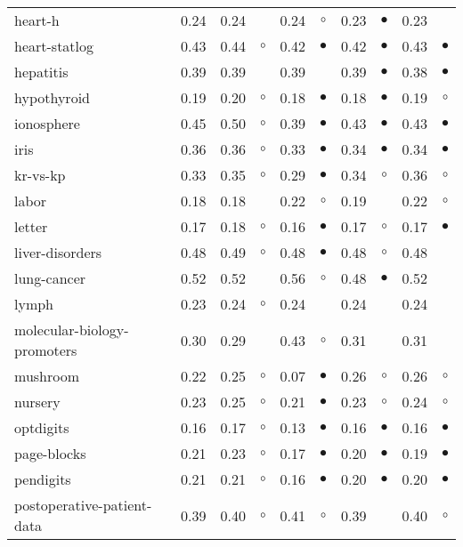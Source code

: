 {\begin{longtable}{lrr@{\hspace{0.1cm}}cr@{\hspace{0.1cm}}cr@{\hspace{0.1cm}}cr@{\hspace{0.1cm}}c}
heart-h & 0.24 & 0.24 &           & 0.24 &   $\circ$ & 0.23 & $\bullet$ & 0.23 &           \\
heart-statlog & 0.43 & 0.44 &   $\circ$ & 0.42 & $\bullet$ & 0.42 & $\bullet$ & 0.43 &  $\bullet$\\
hepatitis & 0.39 & 0.39 &           & 0.39 &           & 0.39 & $\bullet$ & 0.38 &  $\bullet$\\
hypothyroid & 0.19 & 0.20 &   $\circ$ & 0.18 & $\bullet$ & 0.18 & $\bullet$ & 0.19 &    $\circ$\\
ionosphere & 0.45 & 0.50 &   $\circ$ & 0.39 & $\bullet$ & 0.43 & $\bullet$ & 0.43 &  $\bullet$\\
iris & 0.36 & 0.36 &   $\circ$ & 0.33 & $\bullet$ & 0.34 & $\bullet$ & 0.34 &  $\bullet$\\
kr-vs-kp & 0.33 & 0.35 &   $\circ$ & 0.29 & $\bullet$ & 0.34 &   $\circ$ & 0.36 &    $\circ$\\
labor & 0.18 & 0.18 &           & 0.22 &   $\circ$ & 0.19 &           & 0.22 &    $\circ$\\
letter & 0.17 & 0.18 &   $\circ$ & 0.16 & $\bullet$ & 0.17 &   $\circ$ & 0.17 &  $\bullet$\\
liver-disorders & 0.48 & 0.49 &   $\circ$ & 0.48 & $\bullet$ & 0.48 &   $\circ$ & 0.48 &           \\
lung-cancer & 0.52 & 0.52 &           & 0.56 &   $\circ$ & 0.48 & $\bullet$ & 0.52 &           \\
lymph & 0.23 & 0.24 &   $\circ$ & 0.24 &           & 0.24 &           & 0.24 &           \\
molecular-biology-promoters & 0.30 & 0.29 &           & 0.43 &   $\circ$ & 0.31 &           & 0.31 &           \\
mushroom & 0.22 & 0.25 &   $\circ$ & 0.07 & $\bullet$ & 0.26 &   $\circ$ & 0.26 &    $\circ$\\
nursery & 0.23 & 0.25 &   $\circ$ & 0.21 & $\bullet$ & 0.23 &   $\circ$ & 0.24 &    $\circ$\\
optdigits & 0.16 & 0.17 &   $\circ$ & 0.13 & $\bullet$ & 0.16 & $\bullet$ & 0.16 &  $\bullet$\\
page-blocks & 0.21 & 0.23 &   $\circ$ & 0.17 & $\bullet$ & 0.20 & $\bullet$ & 0.19 &  $\bullet$\\
pendigits & 0.21 & 0.21 &   $\circ$ & 0.16 & $\bullet$ & 0.20 & $\bullet$ & 0.20 &  $\bullet$\\
postoperative-patient-data & 0.39 & 0.40 &   $\circ$ & 0.41 &   $\circ$ & 0.39 &           & 0.40 &    $\circ$\\

\end{longtable}}

